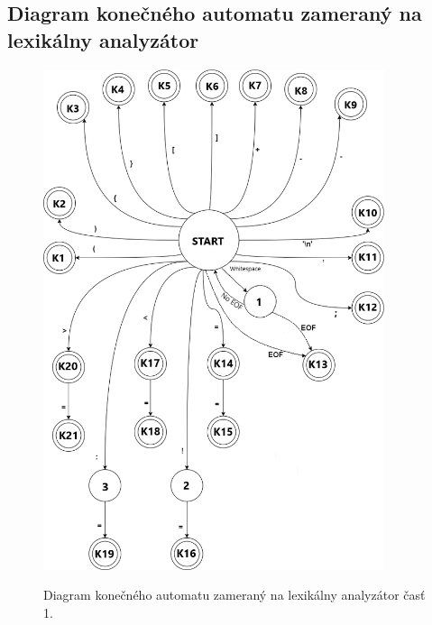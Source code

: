 \documentclass[a4paper,11pt]{article}
\begin{document}
			\cleardoublepage

		\subsection{Diagram konečného automatu zameraný na lexikálny analyzátor}\label{subsec:lexauto}

			\begin{figure}[h]
				\centering
				\includegraphics[width = 10cm]{LA_KA_1.png}\\
				\caption{Diagram konečného automatu zameraný na lexikálny analyzátor časť 1.}
				\label{fig:diaglex1}
			\end{figure}
\end{document}

